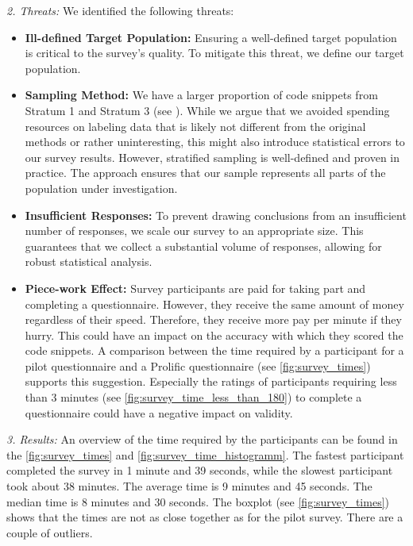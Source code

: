 \documentclass[%
class=scrreprt,
chapterprefix=false,%
open=right,%
twoside=false,%
paper=a4,%
logofile={Logo\_zentral\_farbig\_EN.png},%
thesistype=master,%
UKenglish,%
]{se2thesis}
\theoremstyle{definition}
\begin{document}
\textit{2. Threats:}
	We identified the following threats:
	\begin{itemize}
		\item \textbf{Ill-defined Target Population:} Ensuring a well-defined target population is critical to the survey's quality. To mitigate this threat, we define our target population.
		
		\item \textbf{Sampling Method:} We have a larger proportion of code snippets from Stratum 1 and Stratum 3 (see ). While we argue that we avoided spending resources on labeling data that is likely not different from the original methods or rather uninteresting, this might also introduce statistical errors to our survey results.
		However, stratified sampling is well-defined and proven in practice. The approach ensures that our sample represents all parts of the population under investigation.
		
		\item \textbf{Insufficient Responses:} To prevent drawing conclusions from an insufficient number of responses, we scale our survey to an appropriate size. This guarantees that we collect a substantial volume of responses, allowing for robust statistical analysis.
		
		\item \textbf{Piece-work Effect:} Survey participants are paid for taking part and completing a questionnaire. However, they receive the same amount of money regardless of their speed. Therefore, they receive more pay per minute if they hurry. This could have an impact on the accuracy with which they scored the code snippets. A comparison between the time required by a participant for a pilot questionnaire and a Prolific questionnaire (see \autoref{fig:survey_times}) supports this suggestion. Especially the ratings of participants requiring less than 3 minutes (see \autoref{fig:survey_time_less_than_180}) to complete a questionnaire could have a negative impact on validity. 
		
	\end{itemize}
	
\textit{3. Results:}
	An overview of the time required by the participants can be found in the \autoref{fig:survey_times} and \autoref{fig:survey_time_histogramm}.
	The fastest participant completed the survey in 1 minute and 39 seconds, while the slowest participant took about 38 minutes. 
	The average time is 9 minutes and 45 seconds. The median time is 8 minutes and 30 seconds. The boxplot (see \autoref{fig:survey_times}) shows that the times are not as close together as for the pilot survey. There are a couple of outliers.
	
\end{document}

